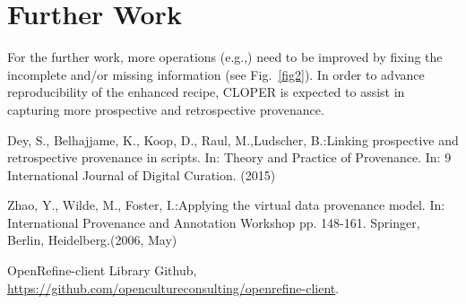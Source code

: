 \documentclass[runningheads]{llncs}
\begin{document}
\section{Further Work}
For the further work, more operations (e.g.,) need to be improved by fixing the incomplete and/or missing information (see Fig.~\ref{fig2}). In order to advance reproducibility of the enhanced recipe, CLOPER is expected to assist in capturing more prospective and retrospective provenance. 

\begin{thebibliography}{8}

Dey, S., Belhajjame, K., Koop, D., Raul, M.,Ludscher, B.:Linking prospective and retrospective provenance in scripts. In: Theory and Practice of Provenance. In: 9 International Journal of Digital Curation. (2015)

Zhao, Y., Wilde, M., Foster, I.:Applying the virtual data provenance model. In: International Provenance and Annotation Workshop pp. 148-161. Springer, Berlin, Heidelberg.(2006, May)

OpenRefine-client Library Github, \url{https://github.com/opencultureconsulting/openrefine-client}. 


\end{thebibliography}
\end{document}
